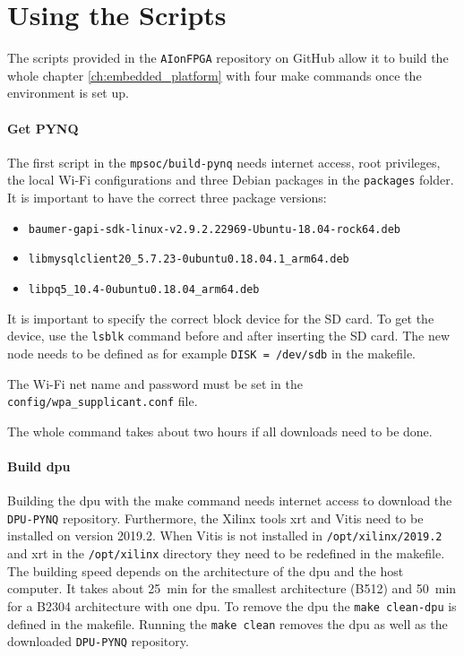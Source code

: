 \section{Using the Scripts}
\label{sec:embedded_platform:using_scripts}

The scripts provided in the \texttt{AIonFPGA} repository on GitHub allow it to build the whole chapter \ref{ch:embedded_platform} with four make commands once the environment is set up.

\paragraph{Get PYNQ}
The first script in the \texttt{mpsoc/build-pynq} needs internet access, root privileges, the local Wi-Fi configurations and three Debian packages in the \texttt{packages} folder.
It is important to have the correct three package versions:
\begin{itemize}
	 \item \texttt{baumer-gapi-sdk-linux-v2.9.2.22969-Ubuntu-18.04-rock64.deb}
	 \item \texttt{libmysqlclient20\_5.7.23-0ubuntu0.18.04.1\_arm64.deb}
	 \item \texttt{libpq5\_10.4-0ubuntu0.18.04\_arm64.deb}
\end{itemize}

It is important to specify the correct block device for the SD card.
To get the device, use the \texttt{lsblk} command before and after inserting the SD card.
The new node needs to be defined as for example \texttt{DISK = /dev/sdb} in the makefile.

The Wi-Fi net name and password must be set in the \texttt{config/wpa\_supplicant.conf} file.

The whole command takes about two hours if all downloads need to be done.

\paragraph{Build \acrshort{dpu}}
Building the \acrshort{dpu} with the make command needs internet access to download the \texttt{DPU-PYNQ} repository.
Furthermore, the Xilinx tools \acrshort{xrt} and Vitis need to be installed on version 2019.2.
When Vitis is not installed in \texttt{/opt/xilinx/2019.2} and \acrshort{xrt} in the \texttt{/opt/xilinx} directory they need to be redefined in the makefile.
The building speed depends on the architecture of the \acrshort{dpu} and the host computer.
It takes about \SI{25}{min} for the smallest architecture (B512) and \SI{50}{min} for a B2304 architecture with one \acrshort{dpu}.
To remove the \acrshort{dpu} the \texttt{make clean-dpu} is defined in the makefile.
Running the \texttt{make clean} removes the \acrshort{dpu} as well as the downloaded \texttt{DPU-PYNQ} repository.

